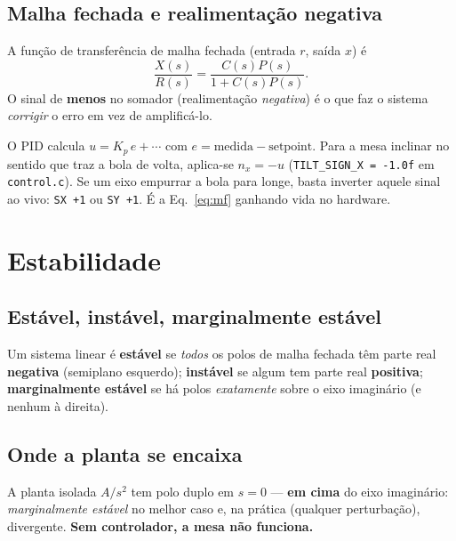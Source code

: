 \section{Malha fechada e realimenta\c{c}\~ao negativa}
A fun\c{c}\~ao de transfer\^encia de malha fechada (entrada $r$, sa\'ida $x$) \'e
\begin{equation}
\frac{X(s)}{R(s)} = \frac{C(s)P(s)}{1+C(s)P(s)}.
\label{eq:mf}
\end{equation}
O sinal de \textbf{menos} no somador (realimenta\c{c}\~ao \emph{negativa}) \'e o que
faz o sistema \emph{corrigir} o erro em vez de amplific\'a-lo.

\begin{projeto}[O sinal no firmware: \texttt{TILT\_SIGN} $=-1$]
O PID calcula $u=K_p\,e+\cdots$ com $e=\text{medida}-\text{setpoint}$. Para a mesa
inclinar no sentido que traz a bola de volta, aplica-se $n_x=-u$
(\texttt{TILT\_SIGN\_X = -1.0f} em \texttt{control.c}). Se um eixo empurrar a bola
para longe, basta inverter aquele sinal ao vivo: \texttt{SX +1} ou \texttt{SY +1}.
\'E a Eq.~\eqref{eq:mf} ganhando vida no hardware.
\end{projeto}

\chapter{Estabilidade}\label{cap:estab}

\section{Est\'avel, inst\'avel, marginalmente est\'avel}
\begin{conceito}
Um sistema linear \'e \textbf{est\'avel} se \emph{todos} os polos de malha fechada
t\^em parte real \textbf{negativa} (semiplano esquerdo); \textbf{inst\'avel} se
algum tem parte real \textbf{positiva}; \textbf{marginalmente est\'avel} se h\'a
polos \emph{exatamente} sobre o eixo imagin\'ario (e nenhum \`a direita).
\end{conceito}

\section{Onde a planta se encaixa}
A planta isolada $A/s^2$ tem polo duplo em $s=0$ --- \textbf{em cima} do eixo
imagin\'ario: \emph{marginalmente est\'avel} no melhor caso e, na pr\'atica
(qualquer perturba\c{c}\~ao), divergente. \textbf{Sem controlador, a mesa n\~ao
funciona.}

